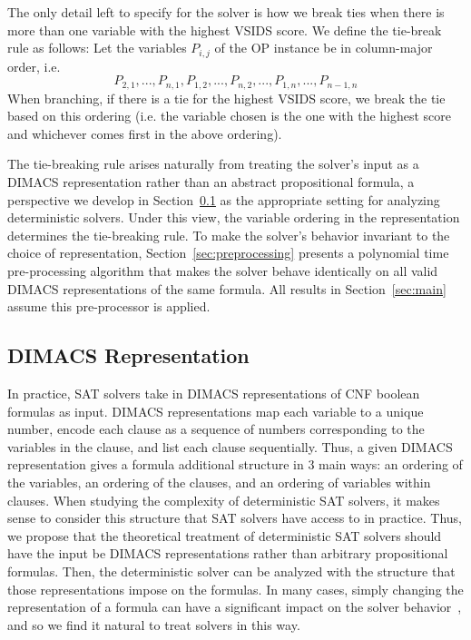 \documentclass[10pt,a4paper]{article}
\begin{document}
The only detail left to specify for the solver is how we break ties when there is more than one variable with the highest VSIDS score. We define the tie-break rule as follows: Let the variables $P_{i, j}$ of the OP instance be in column-major order, i.e. $$P_{2, 1}, ..., P_{n, 1}, P_{1, 2}, ..., P_{n, 2}, ..., P_{1, n}, ..., P_{n - 1, n}$$
When branching, if there is a tie for the highest VSIDS score, we break the tie based on this ordering (i.e. the variable chosen is the one with the highest score and whichever comes first in the above ordering).

The tie-breaking rule arises naturally from treating the solver's input as a DIMACS representation rather than an abstract propositional formula, a perspective we develop in Section~\ref{sec:dimacs} as the appropriate setting for analyzing deterministic solvers. Under this view, the variable ordering in the representation determines the tie-breaking rule. To make the solver's behavior invariant to the choice of representation, Section~\ref{sec:preprocessing} presents a polynomial time pre-processing algorithm that makes the solver behave identically on all valid DIMACS representations of the same formula. All results in Section~\ref{sec:main} assume this pre-processor is applied.

\subsection{DIMACS Representation}
\label{sec:dimacs}

In practice, SAT solvers take in DIMACS representations of CNF boolean formulas as input. DIMACS representations map each variable to a unique number, encode each clause as a sequence of numbers corresponding to the variables in the clause, and list each clause sequentially. Thus, a given DIMACS representation gives a formula additional structure in 3 main ways: an ordering of the variables, an ordering of the clauses, and an ordering of variables within clauses. When studying the complexity of deterministic SAT solvers, it makes sense to consider this structure that SAT solvers have access to in practice. Thus, we propose that the theoretical treatment of deterministic SAT solvers should have the input be DIMACS representations rather than arbitrary propositional formulas. Then, the deterministic solver can be analyzed with the structure that those representations impose on the formulas. In many cases, simply changing the representation of a formula can have a significant impact on the solver behavior~\cite{audemard2008experimenting}, and so we find it natural to treat solvers in this way.
\end{document}

